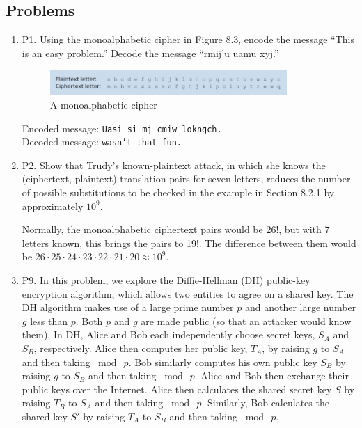 \documentclass[12pt]{article}
\begin{document}
\subsection*{Problems}
\begin{enumerate}
	\item P1. Using the monoalphabetic cipher in Figure 8.3, encode the message “This is an easy problem.” Decode the message “rmij’u uamu xyj.”
	\setcounter{figure}{2}
		\begin{figure}[h!]
		\centering
		\includegraphics[width=0.85\textwidth]{./Images/Fig08-003.png}
		\caption{A monoalphabetic cipher}
		\end{figure}\par
	\color{CrispBlue}Encoded message: \texttt{Uasi si mj cmiw lokngch.}\\
	Decoded message: \texttt{wasn't that fun.}\color{black}
	\item P2. Show that Trudy’s known-plaintext attack, in which she knows the (ciphertext, plaintext) translation pairs for seven letters, reduces the number of possible substitutions to be checked in the example in Section 8.2.1 by approximately \(10^9\).\par
	\color{CrispBlue}Normally, the monoalphabetic ciphertext pairs would be 26!, but with 7 letters known, this brings the pairs to 19!. The difference between them would be \(26\cdot25\cdot24\cdot23\cdot22\cdot21\cdot20\approx10^9\).\color{black}
	\item P9. In this problem, we explore the Diffie-Hellman (DH) public-key encryption algorithm, which allows two entities to agree on a shared key. The DH algorithm makes use of a large prime number \(p\) and another large number \(g\) less than \(p\). Both \(p\) and \(g\) are made public (so that an attacker would know them). In DH, Alice and Bob each independently choose secret keys, \(S_A\) and \(S_B\), respectively. Alice then computes her public key, \(T_A\), by raising \(g\) to \(S_A\) and then taking \(\bmod{\ p}\). Bob similarly computes his own public key \(S_B\) by raising \(g\) to \(S_B\) and then taking \(\bmod{\ p}\). Alice and Bob then exchange their public keys over the Internet. Alice then calculates the shared secret key \(S\) by raising \(T_B\) to \(S_A\) and then taking \(\bmod{\ p}\). Similarly, Bob calculates the shared key \(S'\) by raising \(T_A\) to \(S_B\) and then taking \(\bmod{\ p}\).

\end{enumerate}
\end{document}
